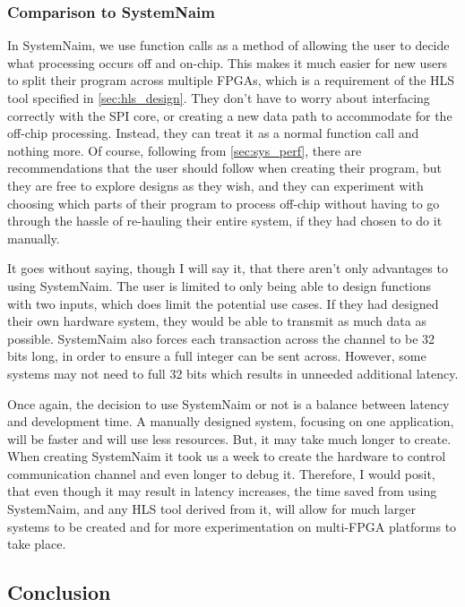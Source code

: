 \subsubsection{Comparison to SystemNaim}

In SystemNaim, we use function calls as a method of allowing the user to decide what processing occurs off and on-chip. This makes it much easier for new users to split their program across multiple FPGAs, which is a requirement of the HLS tool specified in \autoref{sec:hls_design}. They don't have to worry about interfacing correctly with the SPI core, or creating a new data path to accommodate for the off-chip processing. Instead, they can treat it as a normal function call and nothing more. Of course, following from \autoref{sec:sys_perf}, there are recommendations that the user should follow when creating their program, but they are free to explore designs as they wish, and they can experiment with choosing which parts of their program to process off-chip without having to go through the hassle of re-hauling their entire system, if they had chosen to do it manually.

It goes without saying, though I will say it, that there aren't only advantages to using SystemNaim. The user is limited to only being able to design functions with two inputs, which does limit the potential use cases. If they had designed their own hardware system, they would be able to transmit as much data as possible. SystemNaim also forces each transaction across the channel to be 32 bits long, in order to ensure a full integer can be sent across. However, some systems may not need to full 32 bits which results in unneeded additional latency.

Once again, the decision to use SystemNaim or not is a balance between latency and development time. A manually designed system, focusing on one application, will be faster and will use less resources. But, it may take much longer to create. When creating SystemNaim it took us a week to create the hardware to control communication channel and even longer to debug it. Therefore, I would posit, that even though it may result in latency increases, the time saved from using SystemNaim, and any HLS tool derived from it, will allow for much larger systems to be created and for more experimentation on multi-FPGA platforms to take place.

\subsection{Conclusion}

